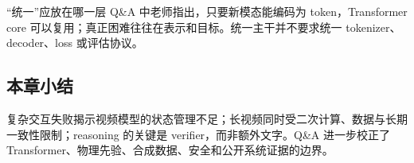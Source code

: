 \begin{knowledgebox}{“统一”应放在哪一层}
Q\&A 中老师指出，只要新模态能编码为 token，Transformer core 可以复用；真正困难往往在表示和目标。统一主干并不要求统一 tokenizer、decoder、loss 或评估协议。
\end{knowledgebox}



\subsection{本章小结}

复杂交互失败揭示视频模型的状态管理不足；长视频同时受二次计算、数据与长期一致性限制；reasoning 的关键是 verifier，而非额外文字。Q\&A 进一步校正了 Transformer、物理先验、合成数据、安全和公开系统证据的边界。

